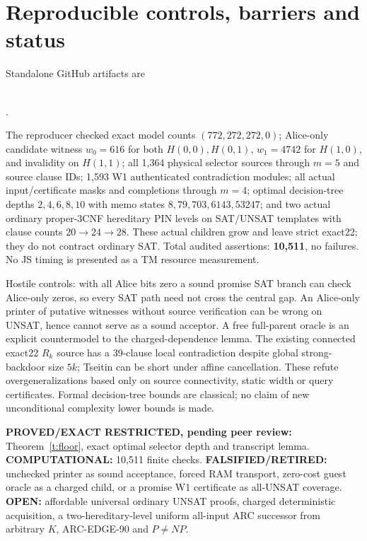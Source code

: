 \documentclass[11pt]{article}
\begin{document}
\section{Reproducible controls, barriers and status}
Standalone GitHub artifacts are
\begin{center}\small
{}\\
.
\end{center}
The reproducer checked exact model counts $(772,272,272,0)$;
Alice-only candidate witness $w_0=616$ for both
$H(0,0),H(0,1)$, $w_1=4742$ for $H(1,0)$,
and invalidity on $H(1,1)$; all 1,364 physical
selector sources through $m=5$ and source clause IDs;
1,593 W1 authenticated contradiction modules;
all actual input/certificate masks and completions
through $m=4$; optimal decision-tree depths
$2,4,6,8,10$ with memo states
$8,79,703,6143,53247$; and two actual ordinary
proper-3CNF hereditary PIN levels on SAT/UNSAT
templates with clause counts $20\to24\to28$.
These actual children grow and leave strict exact22;
they do not contract ordinary SAT. Total audited
assertions: \textbf{10,511}, no failures. No JS
timing is presented as a TM resource measurement.

Hostile controls: with all Alice bits zero a sound
promise SAT branch can check Alice-only zeros,
so every SAT path need not cross the central gap.
An Alice-only printer of putative witnesses without
source verification can be wrong on UNSAT, hence
cannot serve as a sound acceptor. A free full-parent
oracle is an explicit countermodel to the
charged-dependence lemma. The existing connected
exact22 $R_k$ source has a 39-clause local
contradiction despite global strong-backdoor size
$5k$; Tseitin can be short under affine cancellation.
These refute overgeneralizations based only on
source connectivity, static width or query certificates.
Formal decision-tree bounds are classical; no claim
of new unconditional complexity lower bounds is made.

\textbf{PROVED/EXACT RESTRICTED, pending peer review:}
Theorem~\ref{t:floor}, exact optimal selector depth
and transcript lemma.
\textbf{COMPUTATIONAL:} 10,511 finite checks.
\textbf{FALSIFIED/RETIRED:} unchecked printer as
sound acceptance, forced RAM transport, zero-cost
guest oracle as a charged child, or a promise W1
certificate as all-UNSAT coverage.
\textbf{OPEN:} affordable universal ordinary UNSAT
proofs, charged deterministic acquisition, a
two-hereditary-level uniform all-input ARC
successor from arbitrary $K$, ARC-EDGE-90
and $P\ne NP$.
\end{document}
